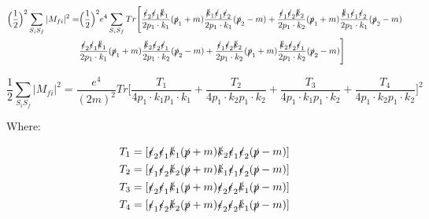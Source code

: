\documentclass[a4]{article}
\begin{document}
    \begin{equation}
        \begin{aligned}
            \Big( \frac{1}{2} \Big)^2 \sum_{S_i S_f} |M_{fi}|^2 = & \Big( \frac{1}{2} \Big)^2 e^4 \sum_{S_i S_f} Tr \Bigg[ \frac{\slashed{\epsilon}_2 \slashed{\epsilon}_1 \slashed{k}_1}{2 p_1 \cdot k_1} (\slashed{p}_1 + m) \frac{\slashed{k}_1 \slashed{\epsilon}_1 \slashed{\epsilon}_2}{2 p_1 \cdot k_1} (\slashed{p}_2 - m) + \frac{\slashed{\epsilon}_1 \slashed{\epsilon}_2 \slashed{k}_2}{2 p_1 \cdot k_2} (\slashed{p}_1 + m) \frac{\slashed{k}_1 \slashed{\epsilon}_1 \slashed{\epsilon}_2}{2 p_1 \cdot k_1} (\slashed{p}_2 - m) \\
            & \frac{\slashed{\epsilon}_2 \slashed{\epsilon}_1 \slashed{k}_1}{2 p_1 \cdot k_1} (\slashed{p}_1 + m) \frac{\slashed{k}_2 \slashed{\epsilon}_2 \slashed{\epsilon}_1}{2 p_1 \cdot k_2} (\slashed{p}_2 - m) + \frac{\slashed{\epsilon}_1 \slashed{\epsilon}_2 \slashed{k}_2}{2 p_1 \cdot k_2} (\slashed{p}_1 + m) \frac{\slashed{k}_2 \slashed{\epsilon}_2 \slashed{\epsilon}_1}{2 p_1 \cdot k_2} (\slashed{p}_2 - m) \Bigg]
        \end{aligned}
    \end{equation}

    \begin{equation}
        \frac{1}{2} \sum_{S_i S_f} |M_{fi}|^2 = \frac{e^4}{(2m)^2} Tr \Bigg[ \frac{T_1}{4 p_1 \cdot k_1 p_1 \cdot k_1} + \frac{T_2}{4 p_1 \cdot k_2 p_1 \cdot k_2} + \frac{T_3}{4 p_1 \cdot k_1 p_1 \cdot k_2} + \frac{T_4}{4 p_1 \cdot k_2 p_1 \cdot k_2} \Bigg]^2
    \end{equation}

    Where: 

    \begin{eqnarray}
        T_1 = [\slashed{\epsilon}_2 \slashed{\epsilon}_1 \slashed{k}_1 (\slashed{p} + m) \slashed{k}_2 \slashed{\epsilon}_1 \slashed{\epsilon}_2 (\slashed{p} - m)] \\
        T_2 = [\slashed{\epsilon}_1 \slashed{\epsilon}_2 \slashed{k}_2 (\slashed{p} + m) \slashed{k}_1 \slashed{\epsilon}_1 \slashed{\epsilon}_2 (\slashed{p} - m)] \\
        T_3 = [\slashed{\epsilon}_2 \slashed{\epsilon}_1 \slashed{k}_1 (\slashed{p} + m) \slashed{\epsilon}_2 \slashed{\epsilon}_2 \slashed{k}_1 (\slashed{p} - m)] \\
        T_4 = [\slashed{\epsilon}_1 \slashed{\epsilon}_2 \slashed{k}_2 (\slashed{p} + m) \slashed{\epsilon}_2 \slashed{\epsilon}_2 \slashed{k}_1 (\slashed{p} - m)] \\
    \end{eqnarray}
\end{document}
